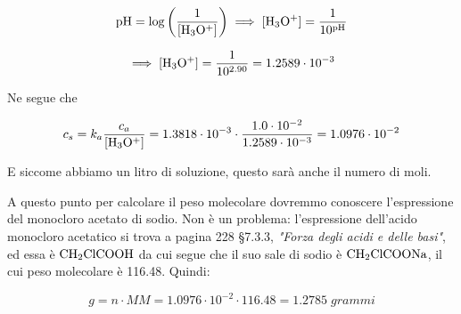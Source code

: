 $$\rm pH=\log{\left(\frac{1}{[H_3O^+]}\right)}
\implies
[H_3O^+]=\frac{1}{10^{pH}}$$

$$\implies
\rm [H_3O^+]=\frac{1}{10^{2.90}}
=1.2589 \cdot 10^{-3}$$

Ne segue che

$$c_s=k_a\frac{c_a}{\rm [H_3O^+]}
=1.3818 \cdot 10^{-3} \cdot \frac{1.0 \cdot 10^{-2}}{1.2589 \cdot 10^{-3}}
=1.0976 \cdot 10^{-2}$$

E siccome abbiamo un litro di soluzione, questo sarà anche il numero di moli.

A questo punto per calcolare il peso molecolare dovremmo conoscere l'espressione del monocloro acetato di sodio. Non è un problema: l'espressione dell'acido monocloro acetatico si trova a pagina 228 §7.3.3, \textit{"Forza degli acidi e delle basi"}, ed essa è $\rm CH_2ClCOOH$ da cui segue che il suo sale di sodio è $\rm CH_2ClCOONa$, il cui peso molecolare è 116.48. Quindi:

$$g=n \cdot MM=1.0976 \cdot 10^{-2} \cdot 116.48=1.2785\;grammi$$